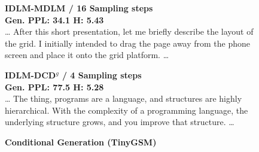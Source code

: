 \begin{figure}[t]
\begin{tcolorbox}
\begin{minipage}[t]{0.485\linewidth}
{\footnotesize\bfseries\textcolor{owtgreen}{IDLM-MDLM / 16 Sampling steps}}\\[-0.2mm]
{\scriptsize\bfseries\textcolor{owtgreen}{Gen. PPL:} 34.1 \quad \textcolor{owtgreen}{H:} 5.43}\\[-0.1mm]
{\scriptsize
\ldots{} After this short presentation, let me briefly describe the layout of the grid. I initially intended to drag the page away from the phone screen and place it onto the grid platform. \ldots{}}
\end{minipage}
\hfill
\begin{minipage}[t]{0.485\linewidth}
{\footnotesize\bfseries\textcolor{owtgreen}{IDLM-DCD$^g$ / 4 Sampling steps}}\\[-0.2mm]
{\scriptsize\bfseries\textcolor{owtgreen}{Gen. PPL:} 77.5 \quad \textcolor{owtgreen}{H:} 5.28}\\[-0.1mm]
{\scriptsize
\ldots{} The thing, programs are a language, and structures are highly hierarchical. With the complexity of a programming language, the underlying structure grows, and you improve that structure. \ldots{}}
\end{minipage}
\end{tcolorbox}
\vspace{-1mm}
\begin{tcolorbox}[
    enhanced,
    colframe=tinyorange,
    colback=orange!3!white,
    boxrule=0.65pt,
    arc=4pt,
    left=5pt,
    right=5pt,
    top=3pt,
    bottom=3pt,
    width=\textwidth,
    before upper={\setlength{\parindent}{0pt}}]
\noindent
\begin{minipage}[c]{0.04\linewidth}
\centering
{}
\end{minipage}%
\begin{minipage}[c]{0.94\linewidth}
{\normalsize\bfseries\textcolor{tinyorange}{Conditional Generation (TinyGSM)}}
\end{minipage}


\end{tcolorbox}
\end{figure}
